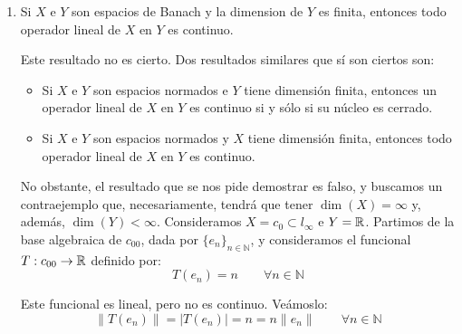 \documentclass[12pt]{article}
\begin{document}
\begin{ejercicio}
\begin{enumerate}
\begin{description}
                Este funcional es lineal, pero no es continuo. Veámoslo:
                \begin{equation*}
                    \|T(u_n)\| = |T(u_n)| = n = n\|u_n\| \qquad \forall n\in \mathbb{N}
                \end{equation*}

                Por tanto, como esta igualdad es válida para todo $n\in \mathbb{N}$, no existe una constante $C>0$ tal que $\|T(x)\|\leq C\|x\|$ para todo $x\in X$, por lo que $T$ no es continuo. Por tanto, $\ker(T)$ no es cerrado, y hemos encontrado un subespacio vectorial de $X$ que no es cerrado.\\

                Por el recíproco, si todos los subespacios vectoriales de $X$ son cerrados, entonces $X$ tiene dimensión finita.
            \end{description}
            \item Si $X$ e $Y$ son espacios de Banach y la dimension de $Y$ es finita, entonces todo operador lineal de $X$ en $Y$ es continuo.
            
            Este resultado no es cierto. Dos resultados similares que sí son ciertos son:
            \begin{itemize}
                \item Si $X$ e $Y$ son espacios normados e $Y$ tiene dimensión finita, entonces un operador lineal de $X$ en $Y$ es continuo si y sólo si su núcleo es cerrado.
                \item Si $X$ e $Y$ son espacios normados y $X$ tiene dimensión finita, entonces todo operador lineal de $X$ en $Y$ es continuo.
            \end{itemize}

            No obstante, el resultado que se nos pide demostrar es falso, y buscamos un contraejemplo que, necesariamente, tendrá que tener $\dim(X) = \infty$ y, además, $\dim(Y) < \infty$. Consideramos $X = c_0\subset l_\infty$ e $Y=\mathbb{R}$. Partimos de la base algebraica de $c_{00}$, dada por $\{e_n\}_{n\in \mathbb{N}}$, y consideramos el funcional $T: c_{00}\to \mathbb{R}$ definido por:
            \begin{equation*}
                T(e_n) = n \qquad \forall n\in \mathbb{N}
            \end{equation*}

            Este funcional es lineal, pero no es continuo. Veámoslo:
            \begin{equation*}
                \|T(e_n)\| = |T(e_n)| = n = n\|e_n\| \qquad \forall n\in \mathbb{N}
            \end{equation*}


\end{enumerate}
\end{ejercicio}
\end{document}
